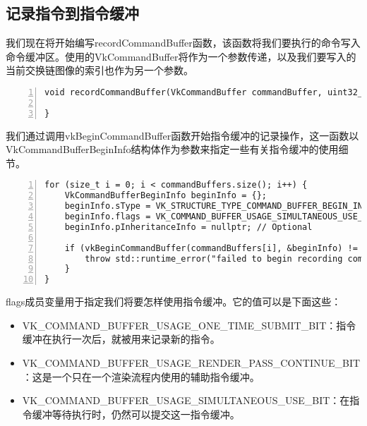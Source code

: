 \documentclass{ctexart}
\begin{document}
\subsection{记录指令到指令缓冲}

我们现在将开始编写recordCommandBuffer函数，该函数将我们要执行的命令写入命令缓冲区。使用的VkCommandBuffer将作为一个参数传递，以及我们要写入的当前交换链图像的索引也作为另一个参数。
\begin{lstlisting}[language={[ANSI]C},keywordstyle=\color{blue!70},commentstyle=\color{red!50!green!50!blue!50},frame=shadowbox, rulesepcolor=\color{red!20!green!20!blue!20},basicstyle=\small,numbers=left, numberstyle=\tiny,breaklines=true]
void recordCommandBuffer(VkCommandBuffer commandBuffer, uint32_t imageIndex) {

}
\end{lstlisting}

我们通过调用vkBeginCommandBuffer函数开始指令缓冲的记录操作，这一函数以VkCommandBufferBeginInfo结构体作为参数来指定一些有关指令缓冲的使用细节。

\begin{lstlisting}[language={[ANSI]C},keywordstyle=\color{blue!70},commentstyle=\color{red!50!green!50!blue!50},frame=shadowbox, rulesepcolor=\color{red!20!green!20!blue!20},basicstyle=\small,numbers=left, numberstyle=\tiny,breaklines=true]
for (size_t i = 0; i < commandBuffers.size(); i++) {
	VkCommandBufferBeginInfo beginInfo = {};
	beginInfo.sType = VK_STRUCTURE_TYPE_COMMAND_BUFFER_BEGIN_INFO;
	beginInfo.flags = VK_COMMAND_BUFFER_USAGE_SIMULTANEOUS_USE_BIT;
	beginInfo.pInheritanceInfo = nullptr; // Optional

	if (vkBeginCommandBuffer(commandBuffers[i], &beginInfo) != VK_SUCCESS) {
		throw std::runtime_error("failed to begin recording command buffer!");
	}
}
\end{lstlisting}

flags成员变量用于指定我们将要怎样使用指令缓冲。它的值可以是下面这些：

\begin{itemize}
	\item VK\_COMMAND\_BUFFER\_USAGE\_ONE\_TIME\_SUBMIT\_BIT：指令缓冲在执行一次后，就被用来记录新的指令。
	\item VK\_COMMAND\_BUFFER\_USAGE\_RENDER\_PASS\_CONTINUE\_BIT：这是一个只在一个渲染流程内使用的辅助指令缓冲。
	\item VK\_COMMAND\_BUFFER\_USAGE\_SIMULTANEOUS\_USE\_BIT：在指令缓冲等待执行时，仍然可以提交这一指令缓冲。
\end{itemize}
\end{document}

